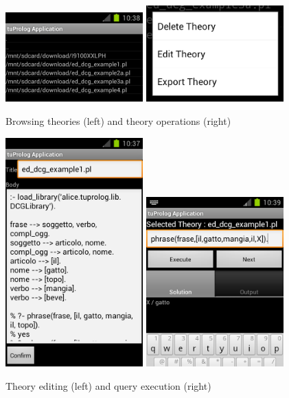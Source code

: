 \begin{figure}
  \includegraphics[width=200px]{images/android6.png}
  \includegraphics[width=200px]{images/android5.png}
  \caption{Browsing theories (left) and theory operations (right)}\label{fig:android56}
\end{figure}

\begin{figure}
  \includegraphics[width=200px]{images/android7.png}
  \includegraphics[width=200px]{images/android8.png}
  \caption{Theory editing (left) and query execution (right)}\label{fig:android78}
\end{figure}

